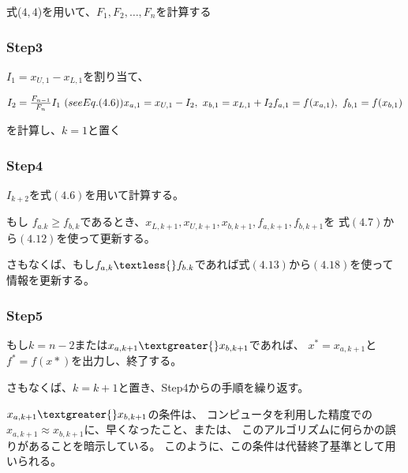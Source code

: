 式($4,4$)を用いて、$F_1, F_2, \dots ,
F_n$を計算する

\subsubsection*{Step3}\label{step3}

$I_1 = x_{U,1} -x_{L,1}$を割り当て、

$ I_2 = \frac{F_{n-1}}{F_n} I_1
\ \text(see Eq. (4.6))
\\ x_{a,1} = x_{U,1} - I_2,
\ x_{b,1} = x_{L,1} + I_2
\\ f_{a,1} = f(x_{a,1}),
\ f_{b,1} = f(x_{b,1}) $

を計算し、$k = 1$と置く

\subsubsection*{Step4}\label{step4}

$I_{k+2}$を式$(4.6)$を用いて計算する。

もし $f_{a.k} \geq
f_{b,k}$であるとき、$x_{L,k+1},x_{U,k+1},x_{b,k+1},f_{a,k+1},f_{b,k+1}$を
式$(4.7)$から$(4.12)$を使って更新する。

さもなくば、もし$f_{a,k} \textless{}
f_{b.k}$であれば式$(4.13)$から$(4.18)$を使って情報を更新する。

\subsubsection*{Step5}\label{step5}

もし$k = n - 2$または$x_{a,k+1} \textgreater{}
x_{b,k+1}$であれば、 $x^\ast =
x_{a,k+1}$と$f^\ast =
f(x\ast)$を出力し、終了する。

さもなくば、$k = k + 1$と置き、Step4からの手順を繰り返す。

$x_{a,k+1} \textgreater{} x_{b,k+1}$の条件は、
コンピュータを利用した精度での$x_{a,k+1} \approx
x_{b,k+1}$に、早くなったこと、または、
このアルゴリズムに何らかの誤りがあることを暗示している。
このように、この条件は代替終了基準として用いられる。
